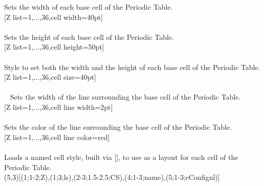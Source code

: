 \label{option_cell width}%
%
{Sets the width of each base cell of the Periodic Table.}%
\\ [5pt][Z list={1,...,36},cell width=40pt]%
\\ [10pt]\makebox[\linewidth][c]{\scalebox{.6}{\pgfPT[Z list={1,...,36},cell width=40pt]}}%
\\ [5pt]\pgfPTendoption%
\label{option_cell height}%
%
{Sets the height of each base cell of the Periodic Table.}%
\\ [5pt][Z list={1,...,36},cell height=50pt]%
\\ [10pt]\makebox[\linewidth][c]{\scalebox{.6}{\pgfPT[Z list={1,...,36},cell height=50pt]}}%
\\ [5pt]\pgfPTendoption%
\label{style_cell size}%
%
{Style to set both the width and the height of each base cell of the Periodic Table.}%
\\ [5pt][Z list={1,...,36},cell size=40pt]%
\\ [10pt]\makebox[\linewidth][c]{\scalebox{.6}{\pgfPT[Z list={1,...,36},cell size=40pt]}}%
\\ [5pt]\pgfPTendstyle%
\newpage\vspace{-34pt}\ %
\label{option_cell line width}%
%
{Sets the width of the line surrounding the base cell of the Periodic Table.}%
\\ [5pt][Z list={1,...,36},cell line width=2pt]%
\\ [10pt]\makebox[\linewidth][c]{\scalebox{.6}{\pgfPT[Z list={1,...,36},cell line width=2pt]}}%
\\ [5pt]\pgfPTendoption%
\label{option_cell line color}%
%
{Sets the color of the line surrounding the base cell of the Periodic Table.}%
\\ [5pt][Z list={1,...,36},cell line color=red]%
\\ [10pt]\makebox[\linewidth][c]{\scalebox{.6}{\pgfPT[Z list={1,...,36},cell line color=red]}}%
\\ [5pt]\pgfPTendoption%
\label{option_cell style}%
%
{Loads a named cell style, built via [], to use as a layout for each cell of the Periodic Table.}%
\\ [5pt](5,3)[(1;1-2;Z),(1;3;ls),(2-3;1.5-2.5;CS),(4;1-3;name),(5;1-3;eConfignl)]%
